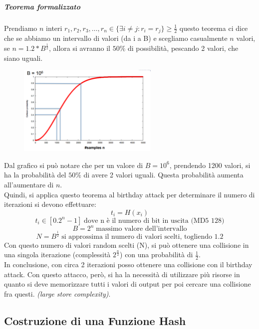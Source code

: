 \documentclass[a4paper,12pt]{article}
\begin{document}
\subparagraph{Teorema formalizzato} Prendiamo $n$ interi $r_1, r_2, r_3, \ldots, r_n \in \{\exists i \neq j : r_i = r_j\} \geq \frac{1}{2}$ 
questo teorema ci dice che se abbiamo un intervallo di valori (da i a B) e scegliamo casualmente $n$ valori, se $n = 1.2 * B^{\frac{1}{2}}$, allora si avranno il $50\%$ di possibilità, pescando 2 valori, che siano uguali. 
\begin{figure}[H]
	\centering
	\includegraphics[width=0.6\textwidth]{img/collision-probability.png}
\end{figure}
Dal grafico si può notare che per un valore di $B = 10^6$, prendendo 1200 valori, 
si ha la probabilità del $50\%$ di avere 2 valori uguali. 
Questa probabilità aumenta all'aumentare di $n$. \\
Quindi, si applica questo teorema al birthday attack per determinare il numero di iterazioni si devono effettuare:\\
$$t_i = H(x_i)$$
$$t_i \in [0.2^n - 1]\; \text{dove n è il numero di bit in uscita (MD5 128)}$$
$$B = 2^n\; \text{massimo valore dell'intervallo}$$
$$N = B^{\frac{1}{2}}\; \text{si approssima il numero di valori scelti, togliendo 1.2}$$ 
Con questo numero di valori random scelti (N), si può ottenere una collisione in una singola iterazione (complessità $2^{\frac{n}{2}}$) con una probabilità di $\frac{1}{2}$. \\
In conclusione, con circa 2 iterazioni posso ottenere una collisione con il birthday attack. Con questo attacco, però, si ha la necessità di utilizzare più risorse in quanto si deve memorizzare tutti i valori di output per poi cercare una collisione fra questi. \textit{(large store complexity)}.

\subsection{Costruzione di una Funzione Hash}
\end{document}
